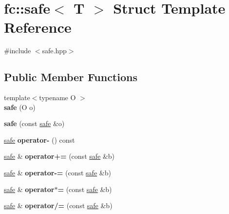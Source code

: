 \hypertarget{structfc_1_1safe}{}\section{fc\+:\+:safe$<$ T $>$ Struct Template Reference}
\label{structfc_1_1safe}


{\ttfamily \#include $<$safe.\+hpp$>$}

\subsection*{Public Member Functions}
\begin{DoxyCompactItemize}
\item 
\mbox{\label{structfc_1_1safe_a3368d162e9ba745605f74388dcd09221}} 
{\footnotesize template$<$typename O $>$ }\\{\bfseries safe} (O o)
\item 
\mbox{\label{structfc_1_1safe_a64f665fd326571b5276dec9f57766da6}} 
{\bfseries safe} (const \mbox{\hyperlink{structfc_1_1safe}{safe}} \&o)
\item 
\mbox{\label{structfc_1_1safe_a616c63b4c91c615a74c1d545d6b20a56}} 
\mbox{\hyperlink{structfc_1_1safe}{safe}} {\bfseries operator-\/} () const
\item 
\mbox{\label{structfc_1_1safe_a25e4c7a4c87c1186e0032541f223aeb4}} 
\mbox{\hyperlink{structfc_1_1safe}{safe}} \& {\bfseries operator+=} (const \mbox{\hyperlink{structfc_1_1safe}{safe}} \&b)
\item 
\mbox{\label{structfc_1_1safe_a1494539bb9d6fa9204d38b776a36fe07}} 
\mbox{\hyperlink{structfc_1_1safe}{safe}} \& {\bfseries operator-\/=} (const \mbox{\hyperlink{structfc_1_1safe}{safe}} \&b)
\item 
\mbox{\label{structfc_1_1safe_a0657fe2766175a3bebdce27df39d05b3}} 
\mbox{\hyperlink{structfc_1_1safe}{safe}} \& {\bfseries operator$\ast$=} (const \mbox{\hyperlink{structfc_1_1safe}{safe}} \&b)
\item 
\mbox{\label{structfc_1_1safe_af4e60fa3a585c1dcb5dd96b43d09dc01}} 
\mbox{\hyperlink{structfc_1_1safe}{safe}} \& {\bfseries operator/=} (const \mbox{\hyperlink{structfc_1_1safe}{safe}} \&b)

\end{DoxyCompactItemize}
